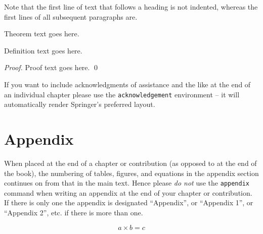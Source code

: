 \documentclass[graybox]{svmult}
\begin{document}
Note that the first line of text that follows a heading is not indented, whereas the first lines of all subsequent paragraphs are.
%
%
\begin{theorem}
Theorem text goes here.
\end{theorem}
%
\begin{definition}
Definition text goes here.
\end{definition}
%
\begin{proof}
\smartqed
Proof text goes here.
\qed
\end{proof}
%
\begin{acknowledgement}
If you want to include acknowledgments of assistance and the like at the end of an individual chapter please use the \verb|acknowledgement| environment -- it will automatically render Springer's preferred layout.
\end{acknowledgement}
%
\section*{Appendix}
%
%
When placed at the end of a chapter or contribution (as opposed to at the end of the book), the numbering of tables, figures, and equations in the appendix section continues on from that in the main text. Hence please \textit{do not} use the \verb|appendix| command when writing an appendix at the end of your chapter or contribution. If there is only one the appendix is designated ``Appendix'', or ``Appendix 1'', or ``Appendix 2'', etc. if there is more than one.

\begin{equation}
a \times b = c
\end{equation}
\end{document}

